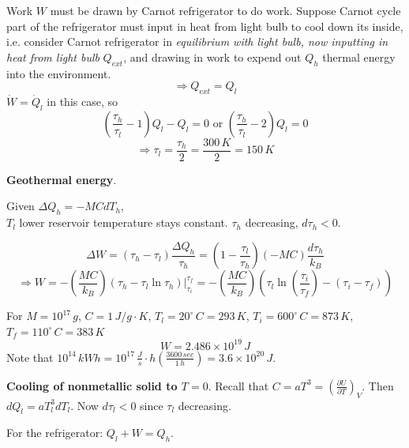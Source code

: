 Work $W$ must be drawn by Carnot refrigerator to do work.  Suppose Carnot cycle part of the refrigerator must input in heat from light bulb to cool down its inside, i.e. consider Carnot refrigerator in \emph{equilibrium with light bulb, now inputting in heat from light bulb} $Q_{ext}$, and drawing in work to expend out $Q_h$ thermal energy into the environment.  
\[
\Longrightarrow \boxed{ Q_{ext} = Q_l }
\]
$\dot{W} = \dot{Q}_l$ in this case, so 
\[
\left( \frac{\tau_h}{\tau_l } - 1 \right) Q_l - Q_l = 0 \text{ or } \left( \frac{\tau_h }{\tau_l } - 2 \right) Q_l = 0 
\]
\[
\Longrightarrow \boxed{ \tau_l = \frac{\tau_h}{2} } = \frac{300 \, K}{2} = 150 \, K
\]











 \textbf{Geothermal energy}.  

Given $\Delta Q_h = -MC dT_h$, \\
$T_l$ lower reservoir temperature stays constant.   $\tau_h$ decreasing, $d\tau_h < 0$.  

\[
\Delta W = (\tau_h - \tau_l ) \frac{\Delta Q_h}{\tau_h} = \left( 1 - \frac{\tau_l}{\tau_h} \right) (-MC) \frac{d\tau_h }{k_B} 
\]
\[
\Longrightarrow W = - \left( \frac{MC}{k_B} \right) \left. ( \tau_h - \tau_l \ln{ \tau_h } ) \right|_{\tau_i}^{\tau_f} = - \left( \frac{MC}{k_B} \right) \left( \tau_l \ln{ \left( \frac{\tau_i }{\tau_f} \right)} - (\tau_i - \tau_f ) \right) 
\]

For $M = 10^{17} \, g$, $C = 1 \, J/g\cdot K$, $T_l = 20^{\circ} \, C = 293 \, K$, $T_i = 600^{\circ} \, C = 873 \, K$, $T_f = 110^{\circ} \, C = 383 \, K$
\[
W = 2.486 \times 10^{19} \, J
\]
Note that $10^{14} \, kWh = 10^{17} \, \frac{J}{s} \cdot h \left( \frac{3600 \, sec}{1 \, h }\right) = 3.6\times 10^{20} \, J$.  






 \textbf{Cooling of nonmetallic solid to $T=0$}.  Recall that $C = aT^3 = \left( \frac{ \partial U}{ \partial T} \right)_V$.  Then $dQ_l = aT_l^3 dT_l$.  Now $d\tau_l <0$ since $\tau_l$ decreasing.  

For the refrigerator: $Q_l + W = Q_h$.  

